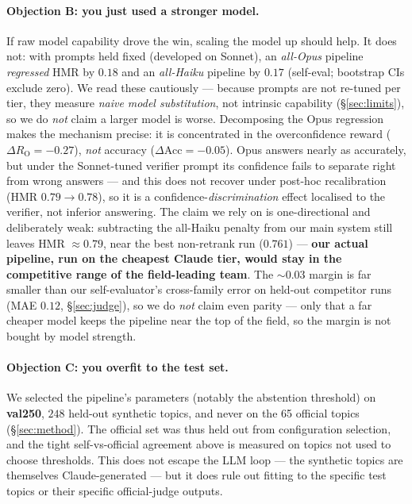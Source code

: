 \documentclass[sigconf,nonacm]{acmart}
\newcommand{\HMR}{\textsc{HMR}}
\newcommand{\RO}{R_{\mathrm{O}}}
\begin{document}
\paragraph{Objection B: you just used a stronger model.} If raw model capability drove the
win, scaling the model up should help. It does not: with prompts held fixed (developed on
Sonnet), an \emph{all-Opus} pipeline \emph{regressed} \HMR{} by $0.18$ and an
\emph{all-Haiku} pipeline by $0.17$ (self-eval; bootstrap CIs exclude zero). We read these
cautiously --- because prompts are not re-tuned per tier, they measure \emph{naive model
substitution}, not intrinsic capability (\S\ref{sec:limits}), so we do \emph{not} claim a
larger model is worse. Decomposing the Opus regression makes the mechanism precise: it is
concentrated in the overconfidence reward ($\Delta\RO{=}{-}0.27$), \emph{not} accuracy
($\Delta\text{Acc}{=}{-}0.05$). Opus answers nearly as accurately, but under the
Sonnet-tuned verifier prompt its confidence fails to separate right from wrong answers ---
and this does not recover under post-hoc recalibration (\HMR{} $0.79\!\to\!0.78$), so it is
a confidence-\emph{discrimination} effect localised to the verifier, not inferior
answering. The claim we rely on is one-directional and deliberately weak: subtracting the all-Haiku
penalty from our main system still leaves \HMR{} $\approx0.79$, near the best
non-retrank run ($0.761$) --- \textbf{our actual pipeline, run on the cheapest Claude tier,
would stay in the competitive range of the field-leading team}. The $\sim0.03$ margin is far
smaller than our self-evaluator's cross-family error on held-out competitor runs
(MAE $0.12$, \S\ref{sec:judge}), so we do \emph{not} claim even parity --- only that a far
cheaper model keeps the pipeline near the top of the field, so the margin is not bought by
model strength.

\paragraph{Objection C: you overfit to the test set.} We selected the pipeline's
parameters (notably the abstention threshold) on \textbf{val250}, $248$ held-out synthetic
topics, and never on the 65 official topics (\S\ref{sec:method}). The official set was thus
held out from configuration selection, and the tight self-vs-official agreement above is
measured on topics not used to choose thresholds. This does not escape the LLM loop --- the
synthetic topics are themselves Claude-generated --- but it does rule out fitting to the
specific test topics or their specific official-judge outputs.
\end{document}
